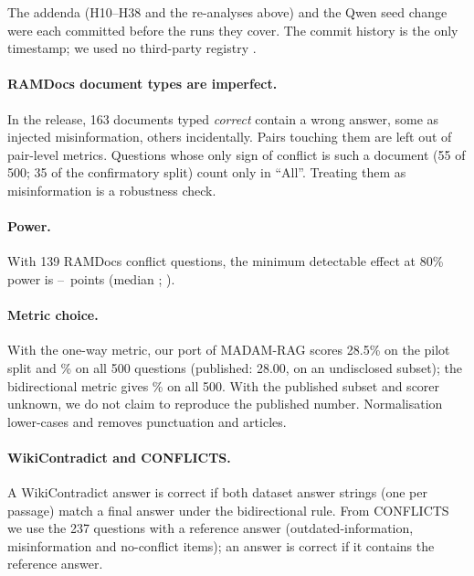 The addenda (H10--H38 and the re-analyses above) and the Qwen seed change were each committed before
the runs they cover. The commit history is the only timestamp; we used no third-party registry
\citep{vanmiltenburg2021preregistering}.

\paragraph{RAMDocs document types are imperfect.} In the release, 163 documents typed \emph{correct} contain a
wrong answer, some as injected misinformation, others incidentally. Pairs touching them are left out of pair-level
metrics. Questions whose only sign of conflict is such a document (55 of 500; 35 of the confirmatory split) count
only in ``All''. Treating them as misinformation is a robustness check.

\paragraph{Power.} With 139 RAMDocs conflict questions, the minimum detectable effect at 80\% power is
\mdeLo--\mdeHi\ points (median \mdeMed; \citealp{card2020power}).

\paragraph{Metric choice.} With the one-way metric, our port of MADAM-RAG scores 28.5\% on the pilot split and
\madamOneWay\% on all 500 questions (published: 28.00, on an undisclosed subset); the bidirectional metric gives
\madamBidir\% on all 500. With the published subset and scorer unknown, we do not claim to reproduce the
published number. Normalisation lower-cases and removes punctuation and articles.

\paragraph{WikiContradict and CONFLICTS.} A WikiContradict answer is correct if both dataset answer strings
(one per passage) match a final answer under the bidirectional rule. From CONFLICTS we use the 237 questions with
a reference answer (outdated-information, misinformation and no-conflict items); an answer is correct if it
contains the reference answer.

